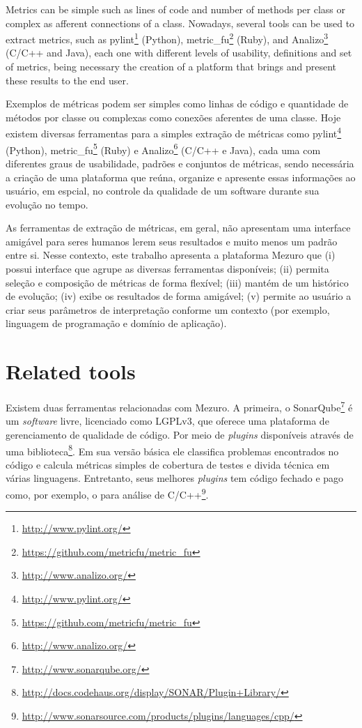 \documentclass{llncs}
\begin{document}
Metrics can be simple such as lines of code and number of methods per class or
complex as afferent connections of a class. Nowadays, several tools can be
used to extract metrics, such as
pylint\footnote{\url{http://www.pylint.org/}} (Python),
metric\_fu\footnote{\url{https://github.com/metricfu/metric_fu}} (Ruby), and
Analizo\footnote{\url{http://www.analizo.org/}} (C/C++ and Java), each one with
different levels of usability, definitions and set of metrics, being necessary
the creation of a platform that brings and present these results to the end
user.


Exemplos de métricas podem ser simples como linhas de código e quantidade de
métodos por classe ou complexas como conexões aferentes de uma classe.  Hoje
existem diversas ferramentas para a simples extração de métricas como
pylint\footnote{\url{http://www.pylint.org/}} (Python),
metric\_fu\footnote{\url{https://github.com/metricfu/metric_fu}} (Ruby) e
Analizo\footnote{\url{http://www.analizo.org/}} (C/C++ e Java), cada uma com
diferentes graus de usabilidade, padrões e conjuntos de métricas, sendo
necessária a criação de uma plataforma que reúna, organize e apresente essas
informações ao usuário, em espcial, no controle da qualidade de um
software durante sua evolução no tempo.

As ferramentas de extração de métricas, em geral, não apresentam uma interface
amigável para seres humanos lerem seus resultados e muito menos um padrão entre
si.  Nesse contexto, este trabalho apresenta a plataforma Mezuro que
(i) possui interface que agrupe as diversas ferramentas disponíveis;
(ii) permita seleção e composição de métricas de forma flexível;
(iii) mantém de um histórico de evolução;
(iv) exibe os resultados de forma amigável;
(v) permite ao usuário a criar seus parâmetros de interpretação conforme um
contexto (por exemplo, linguagem de programação e domínio de aplicação).

\section{Related tools}

Existem duas ferramentas relacionadas com Mezuro. A primeira, o
SonarQube\footnote{\url{http://www.sonarqube.org/}} é um \textit{software}
livre, licenciado como LGPLv3, que oferece uma plataforma de gerenciamento de
qualidade de código. Por meio de \textit{plugins} disponíveis através de uma
biblioteca\footnote{\url{http://docs.codehaus.org/display/SONAR/Plugin+Library/}}.
Em sua versão básica ele classifica problemas encontrados no código e calcula
métricas simples de cobertura de testes e divida técnica em várias linguagens.
Entretanto, seus melhores \textit{plugins} tem código fechado e pago como, por
exemplo, o para análise de
C/C++\footnote{\url{http://www.sonarsource.com/products/plugins/languages/cpp/}}.
\end{document}
